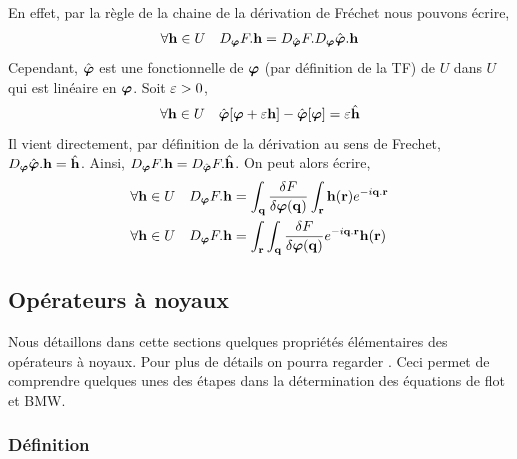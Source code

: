 \documentclass[10.5pt]{article}
\begin{document}
\begin{multicols}{2}
\vspace*{11pt}
{\footnotesize 
\noindent
En effet, par la règle de la chaine de la dérivation de Fréchet nous pouvons écrire, 
\begin{equation}
  \forall {\bf h} \in U \quad D_{\boldsymbol{ \varphi}} F. {\bf h} = D_{\hat{\boldsymbol{ \varphi}}} F. D_{\boldsymbol{ \varphi}} \hat{\boldsymbol{ \varphi}}.{\bf h} 
\end{equation}
Cependant, $\hat{\boldsymbol{ \varphi}}$ est une fonctionnelle de $\boldsymbol{ \varphi}$ (par définition de la TF) de $U$ dans $U$ qui est linéaire en $\boldsymbol{ \varphi}$. Soit $\varepsilon >0$, 
\begin{equation}
  \forall {\bf h} \in U \quad \hat{\boldsymbol{ \varphi}}[\boldsymbol{ \varphi} + \varepsilon {\bf h}] - \hat{\boldsymbol{ \varphi}}[\boldsymbol{ \varphi}] = \varepsilon \hat{{\bf h}} 
\end{equation} 
Il vient directement, par définition de la dérivation au sens de Frechet, $D_{\boldsymbol{ \varphi}} \hat{\boldsymbol{ \varphi}} .{\bf h} = \hat{{\bf h}}$.  
Ainsi,  $D_{\boldsymbol{ \varphi}} F .{\bf h} = D_{\hat{\boldsymbol{ \varphi}}}F.\hat{{\bf h}}$.  On peut alors écrire, 
\begin{align}
  \forall {\bf h} \in U  \quad D_{\boldsymbol{ \varphi}} F .{\bf h} & = \int_{{\bf q}} \frac{\delta F}{\delta \boldsymbol{ \varphi}({\bf q})} \int_{{\bf r}} {\bf h}({\bf r}) e^{-i{\bf q}.{\bf r}} \\
  \forall {\bf h} \in U  \quad D_{\boldsymbol{ \varphi}} F .{\bf h} & = \int_{{\bf r}} \int_{{\bf q}} \frac{\delta F}{\delta \boldsymbol{ \varphi}({\bf q})} e^{-i{\bf q}.{\bf r} } {\bf h}({\bf r})
\end{align}
}



\subsection{Opérateurs à noyaux}

Nous détaillons dans cette sections quelques propriétés élémentaires des opérateurs à noyaux. Pour plus de détails on pourra regarder \cite{}. Ceci permet de comprendre quelques unes des étapes dans la détermination des équations de flot et BMW. \\



\subsubsection{Définition}


\end{multicols}
\end{document}
